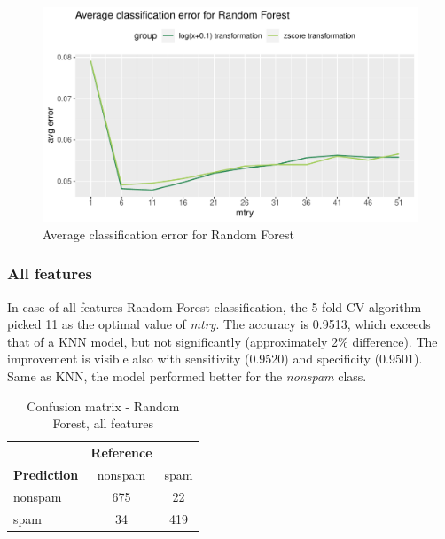 \documentclass{article}\usepackage[]{graphicx}\usepackage[]{xcolor}
\makeatletter
\def\maxwidth{ %
  \ifdim\Gin@nat@width>\linewidth
    \linewidth
  \else
    \Gin@nat@width
  \fi
}
\newenvironment{knitrout}{}{} %
\makeatother
\begin{document}
\begin{knitrout}
\color{fgcolor}\begin{figure}[h]
\includegraphics[width=\maxwidth]{figure/avgErrRF-1} \caption[\label{fig10} Average classification error for Random Forest]{\label{fig10} Average classification error for Random Forest}\label{fig:avgErrRF}
\end{figure}

\end{knitrout}

\subsubsection*{All features}

In case of all features Random Forest classification, the 5-fold CV algorithm picked 
11 as the optimal value of \textit{mtry}. The accuracy is 0.9513, which exceeds that 
of a KNN model, but not significantly (approximately 2\% difference).
The improvement is visible also with sensitivity (0.9520) and specificity (0.9501).
Same as KNN, the model performed better for the \textit{nonspam} class.

\begin{table}[h]
    \centering
    \begin{tabular}{lcc}
        & \textbf{Reference} & \\
        \textbf{Prediction} & nonspam & spam \\
        nonspam & 675 & 22 \\
        spam & 34 & 419 \\
    \end{tabular}
    \caption{Confusion matrix - Random Forest, all features}
    \label{RFcm1}
\end{table}
\end{document}

